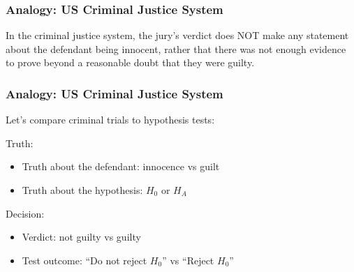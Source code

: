 \documentclass[handout]{beamer}
\newcommand{\blue}[1]{\textcolor{blue2}{#1}}
\begin{document}
\begin{frame}
\frametitle{Analogy:  US Criminal Justice System}

In the criminal justice system, the jury's verdict does NOT make any statement about the defendant being \blue{innocent}, rather that there was not enough evidence to prove beyond a reasonable doubt that they were guilty.

\end{frame}


\begin{frame}
\frametitle{Analogy:  US Criminal Justice System}

Let's compare criminal trials to hypothesis tests:

\vspace{0.5cm}

\pause \blue{Truth}:
\begin{itemize}
\pause \item Truth about the defendant: innocence vs guilt
\pause \item Truth about the hypothesis: $H_0$ or $H_A$
\end{itemize}

\vspace{0.25cm}

\pause \blue{Decision}:
\begin{itemize}
\pause \item Verdict:  not guilty vs guilty
\pause \item Test outcome: ``Do not reject $H_0$'' vs ``Reject $H_0$''
\end{itemize}

\end{frame}
\end{document}
